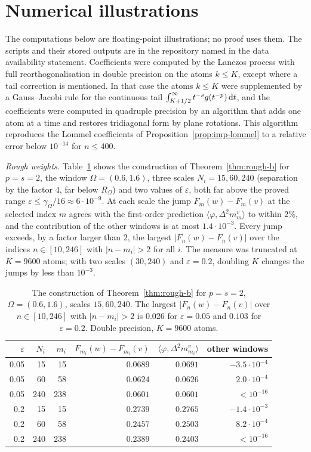 \section{Numerical illustrations}\label{sec:numerics}

The computations below are floating-point illustrations; no proof uses them. The scripts and their stored outputs
are in the repository named in the data availability statement. Coefficients were computed by the Lanczos
process with full reorthogonalisation in double precision on the atoms $k\le K$, except where a tail correction is
mentioned. In that case the atoms $k\le K$ were supplemented by a Gauss--Jacobi rule for the continuous tail
$\int_{K+1/2}^\infty t^{-s}g(t^{-p})\,\mathrm{d} t$, and the coefficients were computed in quadruple precision by an algorithm
that adds one atom at a time and restores tridiagonal form by plane rotations. This algorithm reproduces the Lommel
coefficients of
Proposition~\ref{prop:imp-lommel} to a relative error below $10^{-14}$ for $n\le400$.

\emph{Rough weights.} Table~\ref{tab:rough} shows the construction of Theorem~\ref{thm:rough-b} for $p=s=2$, the window
$\Omega=(0.6,1.6)$, three scales $N_i=15,60,240$ (separation by the factor $4$, far below $R_\Omega$) and two values of
$\varepsilon$, both far above the proved range $\varepsilon\le\gamma_\Omega/16\approx6\cdot10^{-9}$. At each scale the jump
$F_m(w)-F_m(v)$ at the selected index $m$ agrees with the first-order prediction $\langle\varphi,\Delta^2m_m^v\rangle$
to within $2\%$, and the contribution of the other windows is at most $1.4\cdot10^{-3}$. Every jump exceeds, by a factor larger
than $2$, the largest $|F_n(w)-F_n(v)|$ over the indices $n\in[10,246]$ with $|n-m_i|>2$ for all $i$. The measure was truncated at
$K=9600$ atoms; with two scales $(30,240)$ and $\varepsilon=0.2$, doubling $K$ changes the jumps by less than
$10^{-3}$.

\begin{table}[ht]
\centering
\small
\begin{tabular}{rrrrrr}
\toprule
$\varepsilon$ & $N_i$ & $m_i$ & $F_{m_i}(w)-F_{m_i}(v)$ & $\langle\varphi,\Delta^2m^v_{m_i}\rangle$ & other windows\\
\midrule
0.05 & 15  & 15  & $0.0689$ & $0.0691$ & $-3.5\cdot10^{-4}$\\
0.05 & 60  & 58  & $0.0624$ & $0.0626$ & $2.0\cdot10^{-4}$\\
0.05 & 240 & 238 & $0.0601$ & $0.0601$ & $<10^{-16}$\\
0.2  & 15  & 15  & $0.2739$ & $0.2765$ & $-1.4\cdot10^{-3}$\\
0.2  & 60  & 58  & $0.2457$ & $0.2503$ & $8.2\cdot10^{-4}$\\
0.2  & 240 & 238 & $0.2389$ & $0.2403$ & $<10^{-16}$\\
\bottomrule
\end{tabular}
\caption{The construction of Theorem~\ref{thm:rough-b} for $p=s=2$, $\Omega=(0.6,1.6)$, scales $15,60,240$. The largest
$|F_n(w)-F_n(v)|$ over $n\in[10,246]$ with $|n-m_i|>2$ is $0.026$ for $\varepsilon=0.05$ and $0.103$ for
$\varepsilon=0.2$. Double precision, $K=9600$ atoms.}
\label{tab:rough}
\end{table}


